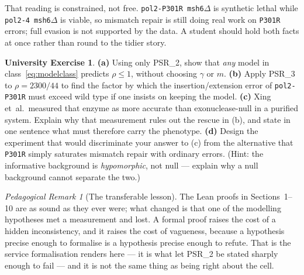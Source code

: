 \documentclass[11pt,a4paper]{article}
\theoremstyle{definition}
\newtheorem{exercise}[theorem]{University Exercise}
\theoremstyle{remark}
\newtheorem{remark}[theorem]{Pedagogical Remark}
\begin{document}
That reading is constrained, not free. \texttt{pol2-P301R msh6$\Delta$} is synthetic lethal while \texttt{pol2-4 msh6$\Delta$} is viable, so mismatch repair is still doing real work on \texttt{P301R} errors; full evasion is not supported by the data. A student should hold both facts at once rather than round to the tidier story.

\begin{exercise}
\textbf{(a)} Using only PSR\_2, show that \emph{any} model in class~\eqref{eq:modelclass} predicts $\rho \le 1$, without choosing $\gamma$ or $m$.
\textbf{(b)} Apply PSR\_3 to $\rho = 2300/44$ to find the factor by which the insertion/extension error of \texttt{pol2-P301R} must exceed wild type if one insists on keeping the model.
\textbf{(c)} Xing et~al.\ measured that enzyme as more accurate than exonuclease-null in a purified system. Explain why that measurement rules out the rescue in (b), and state in one sentence what must therefore carry the phenotype.
\textbf{(d)} Design the experiment that would discriminate your answer to (c) from the alternative that \texttt{P301R} simply saturates mismatch repair with ordinary errors. (Hint: the informative background is \emph{hypomorphic}, not null --- explain why a null background cannot separate the two.)
\end{exercise}

\begin{remark}[The transferable lesson]
The Lean proofs in Sections~1--10 are as sound as they ever were; what changed is that one of the modelling hypotheses met a measurement and lost. A formal proof raises the cost of a hidden inconsistency, and it raises the cost of vagueness, because a hypothesis precise enough to formalise is a hypothesis precise enough to refute. That is the service formalisation renders here --- it is what let PSR\_2 be stated sharply enough to fail --- and it is not the same thing as being right about the cell.
\end{remark}
\end{document}
